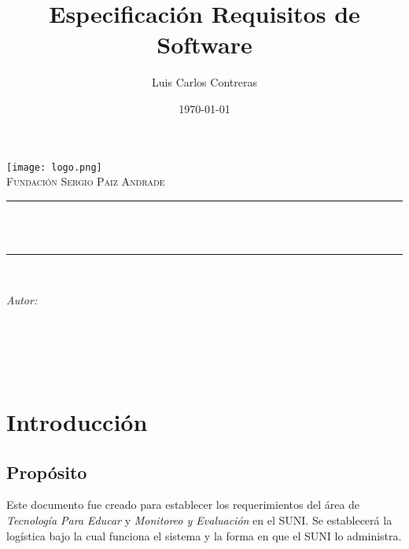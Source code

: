 \documentclass[11pt]{report}
\title{Especificación Requisitos de Software}								%
\author{Luis Carlos Contreras}								%
\date{\today}											%
\makeatletter
\let\thetitle\@title
\let\theauthor\@author
\let\thedate\@date
\makeatother
\begin{document}
	\sloppy
	
	\begin{titlepage}
		\centering
		\vspace*{0.5 cm}
		\texttt{[image: logo.png]}\\[1.0 cm]	%
		\textsc{\LARGE Fundación Sergio Paiz Andrade}\\[2.0 cm]	%
		\rule{\linewidth}{0.2 mm} \\[0.4 cm]
		{ \huge \bfseries \thetitle}\\
		\rule{\linewidth}{0.2 mm} \\[1.5 cm]
		
		\begin{minipage}{0.4\textwidth}
			\begin{flushleft} \large
				\emph{Autor:}\\
				\theauthor
			\end{flushleft}
		\end{minipage}~
		\begin{minipage}{0.4\textwidth}
			\begin{flushright} \large
			\end{flushright}
		\end{minipage}\\[2 cm]
		
		{\large \thedate}\\[2 cm]
		
		\vfill
		
	\end{titlepage}
	
	
	\tableofcontents
	\listoffigures
	\pagebreak
	
	
	\chapter{Introducción}
	\section{Propósito}
	Este documento fue creado para establecer los requerimientos del área de \textit{Tecnología Para Educar} y \textit{Monitoreo y Evaluación} en el SUNI. Se establecerá la logística bajo la cual funciona el sistema y la forma en que el SUNI lo administra.
	
\end{document}
